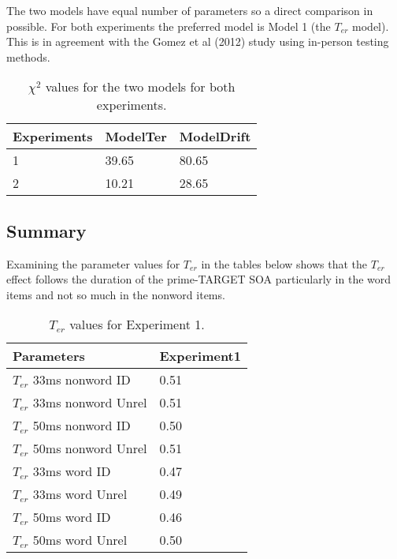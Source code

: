 \documentclass[
  english,
  man]{apa6}
\begin{document}
\begin{appendix}
The two models have equal number of parameters so a direct comparison in
possible. For both experiments the preferred model is Model 1 (the
\(T_{er}\) model). This is in agreement with the Gomez et al (2012)
study using in-person testing methods.

\begin{table}[tbp]

\begin{center}
\begin{threeparttable}

\caption{\label{tab:appendix_model_parameters_table}$\chi^2$ values for the two models for both experiments.}

\begin{tabular}{lll}
\toprule
Experiments & \multicolumn{1}{c}{ModelTer} & \multicolumn{1}{c}{ModelDrift}\\
\midrule
1 & 39.65 & 80.65\\
2 & 10.21 & 28.65\\
\bottomrule
\end{tabular}

\end{threeparttable}
\end{center}

\end{table}

\hypertarget{summary}{%
\subsection{Summary}\label{summary}}

Examining the parameter values for \(T_{er}\) in the tables below shows
that the \(T_{er}\) effect follows the duration of the prime-TARGET SOA
particularly in the word items and not so much in the nonword items.

\begin{table}[tbp]

\begin{center}
\begin{threeparttable}

\caption{\label{tab:appendix_table_2}$T_{er}$ values for Experiment 1.}

\begin{tabular}{ll}
\toprule
Parameters & \multicolumn{1}{c}{Experiment1}\\
\midrule
$T_{er}$  33ms nonword ID & 0.51\\
$T_{er}$ 33ms nonword Unrel & 0.51\\
$T_{er}$  50ms nonword ID & 0.50\\
$T_{er}$ 50ms nonword Unrel & 0.51\\
$T_{er}$  33ms word ID & 0.47\\
$T_{er}$ 33ms word Unrel & 0.49\\
$T_{er}$  50ms word ID & 0.46\\
$T_{er}$ 50ms word Unrel & 0.50\\
\bottomrule
\end{tabular}


\end{threeparttable}
\end{center}
\end{table}
\end{appendix}
\end{document}
